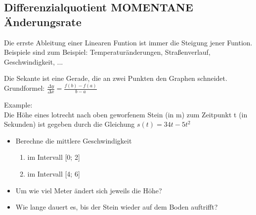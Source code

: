 \subsection{Differenzialquotient MOMENTANE Änderungsrate }

\hfill \break
Die errste Ableitung einer Linearen Funtion ist immer die Steigung jener Funtion.\\
Beispiele sind zum Beispiel: Temperaturänderungen, Straßenverlauf, Geschwindigkeit, ...

\hfill \break
Die Sekante ist eine Gerade, die an zwei Punkten den 
Graphen schneidet.\\

\hfill \break
Grundformel: $\frac{\Delta y}{\Delta x} = \frac{f(b) - f(a)}{b - a}$

\hfill \break
Example:\\
Die Höhe eines lotrecht nach oben geworfenem Stein (in m) zum Zeitpunkt t (in Sekunden) ist gegeben
durch die Gleichung $s(t) = 34t- 5t^2$\\
\begin{itemize}
    \item Berechne die mittlere Geschwindigkeit \begin{enumerate}
              \item im Intervall [0; 2]
              \item im Intervall [4; 6]
          \end{enumerate}
    \item  Um wie viel Meter ändert sich jeweils die Höhe?
    \item Wie lange dauert es, bis der Stein wieder auf dem Boden auftrifft?
\end{itemize}

